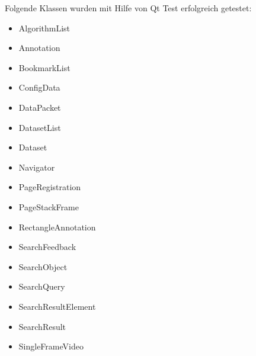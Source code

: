 Folgende Klassen wurden mit Hilfe von Qt Test erfolgreich getestet:
\begin{itemize}
\item AlgorithmList
\item Annotation
\item BookmarkList
\item ConfigData
\item DataPacket
\item DatasetList
\item Dataset
\item Navigator
\item PageRegistration
\item PageStackFrame
\item RectangleAnnotation
\item SearchFeedback
\item SearchObject
\item SearchQuery
\item SearchResultElement
\item SearchResult
\item SingleFrameVideo
\end{itemize}
